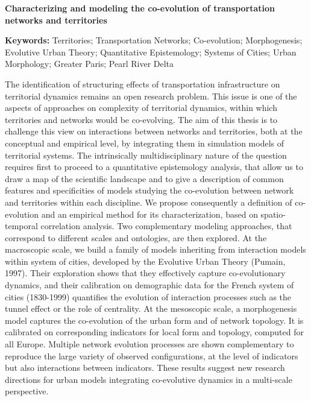 \documentclass[9pt]{article}
\begin{document}
\vspace{1.5cm}

\noindent\textbf{Characterizing and modeling the co-evolution of transportation networks and territories}

\bigskip

\noindent\textbf{Keywords: } Territories; Transportation Networks; Co-evolution; Morphogenesis; Evolutive Urban Theory; Quantitative Epistemology; Systems of Cities; Urban Morphology; Greater Paris; Pearl River Delta

\bigskip

\noindent
The identification of structuring effects of transportation infrastructure on territorial dynamics remains an open research problem. This issue is one of the aspects of approaches on complexity of territorial dynamics, within which territories and networks would be co-evolving. The aim of this thesis is to challenge this view on interactions between networks and territories, both at the conceptual and empirical level, by integrating them in simulation models of territorial systems. The intrinsically multidisciplinary nature of the question requires first to proceed to a quantitative epistemology analysis, that allow us to draw a map of the scientific landscape and to give a description of common features and specificities of models studying the co-evolution between network and territories within each discipline. We propose consequently a definition of co-evolution and an empirical method for its characterization, based on spatio-temporal correlation analysis. Two complementary modeling approaches, that correspond to different scales and ontologies, are then explored. At the macroscopic scale, we build a family of models inheriting from interaction models within system of cities, developed by the Evolutive Urban Theory (Pumain, 1997). Their exploration shows that they effectively capture co-evolutionary dynamics, and their calibration on demographic data for the French system of cities (1830-1999) quantifies the evolution of interaction processes such as the tunnel effect or the role of centrality. At the mesoscopic scale, a morphogenesis model captures the co-evolution of the urban form and of network topology. It is calibrated on corresponding indicators for local form and topology, computed for all Europe. Multiple network evolution processes are shown complementary to reproduce the large variety of observed configurations, at the level of indicators but also interactions between indicators. These results suggest new research directions for urban models integrating co-evolutive dynamics in a multi-scale perspective.
\end{document}

